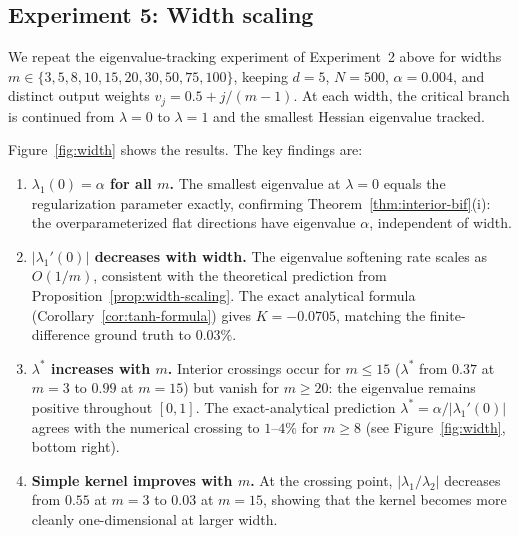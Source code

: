 \documentclass[11pt, reqno]{amsart}
\theoremstyle{plain}
\theoremstyle{definition}
\theoremstyle{remark}
\begin{document}
\subsection{Experiment 5: Width scaling}\label{ssec:width-scaling-exp}

We repeat the eigenvalue-tracking experiment of Experiment~2 above for widths $m\in\{3,5,8,10,15,20,30,50,75,100\}$, keeping $d=5$, $N=500$, $\alpha=0.004$, and distinct output weights $v_j=0.5+j/(m-1)$.  At each width, the critical branch is continued from $\lambda=0$ to $\lambda=1$ and the smallest Hessian eigenvalue tracked.

Figure~\ref{fig:width} shows the results.  The key findings are:

\begin{enumerate}[label=(\roman*)]
\item \textbf{$\lambda_1(0)=\alpha$ for all $m$.}  The smallest eigenvalue at $\lambda=0$ equals the regularization parameter exactly, confirming Theorem~\ref{thm:interior-bif}(i): the overparameterized flat directions have eigenvalue $\alpha$, independent of width.

\item \textbf{$|\lambda_1'(0)|$ decreases with width.}  The eigenvalue softening rate scales as $O(1/m)$, consistent with the theoretical prediction from Proposition~\ref{prop:width-scaling}.  The exact analytical formula (Corollary~\ref{cor:tanh-formula}) gives $K=-0.0705$, matching the finite-difference ground truth to $0.03\%$.

\item \textbf{$\lambda^*$ increases with $m$.}  Interior crossings occur for $m\le 15$ ($\lambda^*$ from $0.37$ at $m=3$ to $0.99$ at $m=15$) but vanish for $m\ge 20$: the eigenvalue remains positive throughout $[0,1]$.  The exact-analytical prediction $\lambda^*=\alpha/|\lambda_1'(0)|$ agrees with the numerical crossing to $1$--$4\%$ for $m\ge 8$ (see Figure~\ref{fig:width}, bottom right).

\item \textbf{Simple kernel improves with $m$.}  At the crossing point, $|\lambda_1/\lambda_2|$ decreases from $0.55$ at $m=3$ to $0.03$ at $m=15$, showing that the kernel becomes more cleanly one-dimensional at larger width.
\end{enumerate}
\end{document}
